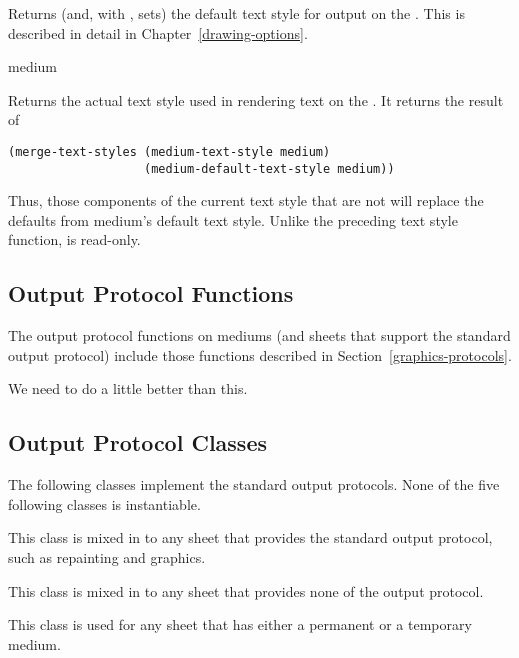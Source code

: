 Returns (and, with , sets) the default text style for output on the
 .  This is described in detail in
Chapter~\ref{drawing-options}.


 {medium}

Returns the actual text style used in rendering text on the 
.  It returns the result of

\begin{verbatim} 
(merge-text-styles (medium-text-style medium)
                   (medium-default-text-style medium))
\end{verbatim}

Thus, those components of the current text style that are not  will
replace the defaults from medium's default text style.  Unlike the preceding
text style function,  is read-only.


\subsection {Output Protocol Functions} 

The output protocol functions on mediums (and sheets that support the
standard output protocol) include those functions described in
Section~\ref{graphics-protocols}.

 {We need to do a little better than this.}


\subsection {Output Protocol Classes}

The following classes implement the standard output protocols.  None of the five
following classes is instantiable.


This class is mixed in to any sheet that provides the standard output protocol,
such as repainting and graphics.


This class is mixed in to any sheet that provides none of the output protocol.


This class is used for any sheet that has either a permanent or a temporary
medium.


